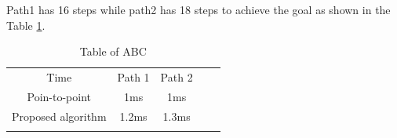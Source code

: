 
\noindent Path1 has 16 steps while path2 has 18 steps to achieve the goal as shown in the Table \ref{tab:timeCubeExtension}.

\begin{table}[H]
\caption{Table of ABC}
\centering
\begin{tabular}{cccll}
\cline{1-3}
\multicolumn{1}{|c|}{Time}          & \multicolumn{1}{c|}{Path 1} & \multicolumn{1}{c|}{Path 2} &  &  \\ \cline{1-3}
\multicolumn{1}{|c|}{Poin-to-point} & \multicolumn{1}{c|}{1ms}    & \multicolumn{1}{c|}{1ms}    &  &  \\ \cline{1-3}
\multicolumn{1}{|c|}{Proposed algorithm} & \multicolumn{1}{c|}{1.2ms} & \multicolumn{1}{c|}{1.3ms} &  &  \\ \cline{1-3}
\multicolumn{1}{l}{}                & \multicolumn{1}{l}{}        & \multicolumn{1}{l}{}        &  & 
\end{tabular}
\label{tab:timeCubeExtension}
\end{table}

